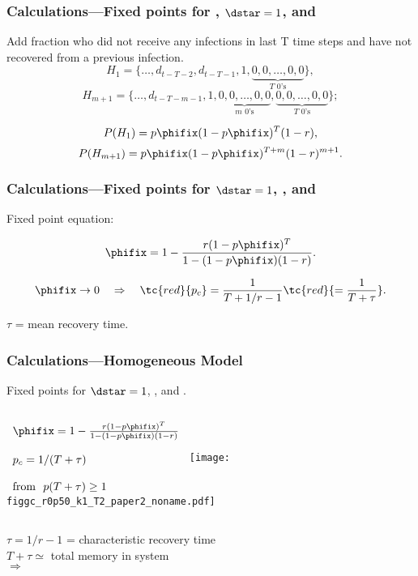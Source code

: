 \begin{frame}
  \frametitle{Calculations---Fixed points for , $\dstar=1$, and }

  Add fraction who did not receive any infections in last T time steps
  and have not recovered from a previous infection.
  $$H_1 = \{ \ldots, d_{t-T-2}, d_{t-T-1}, 1, \underbrace{0, 0, \ldots, 0, 0}_{\mbox{$T$ 0's}} \},$$
  $$H_{m+1} = \{ \ldots, d_{t-T-m-1}, 1, \underbrace{0, 0, \ldots, 0, 0}_{\mbox{$m$ 0's}}, \underbrace{0, 0, \ldots, 0, 0}_{\mbox{$T$ 0's}} \};$$

  $$P(H_1) = p\phifix (1 -p\phifix)^T (1-r), $$
  $$P(H_{m+1}) = p\phifix (1 -p\phifix)^{T+m} (1-r)^{m+1}. $$

\end{frame}

\begin{frame}
  \frametitle{Calculations---Fixed points for $\dstar=1$, , and }

  Fixed point equation:

  $$
  \phifix =
 1 - \frac{r (1-p\phifix)^T }
    {1 - (1-p\phifix)(1-r)}.
  $$

  $$
  \phifix \rightarrow 0
  \quad \Rightarrow \quad 
  \tc{red}{p_c} = \frac{1}{T + 1/r - 1} \tc{red}{= \frac{1}{T + \tau}}.
  $$

  \hfill $\tau$ = mean recovery time.

\end{frame}


\begin{frame}
  \frametitle{Calculations---Homogeneous Model}

  Fixed points for $\dstar=1$, ,  and .
  \begin{columns}
    $
    \begin{array}{l}
      \phifix =
      1 - \frac{r (1-p\phifix)^T }
      {1 - (1-p\phifix)(1-r)}\\
      \\
      p_c = 1/(T+\tau)\\
      \\
      \mbox{from} \ \ p (T+\tau) \ge 1
    \end{array}
    $
  \texttt{[image: figgc\_r0p50\_k1\_T2\_paper2\_noname.pdf]}
  \end{columns}

  $\tau = 1/r - 1$ = characteristic recovery time\\
  $T + \tau \simeq $  total memory in system\\
  \hfill $\Rightarrow$  

\end{frame}



